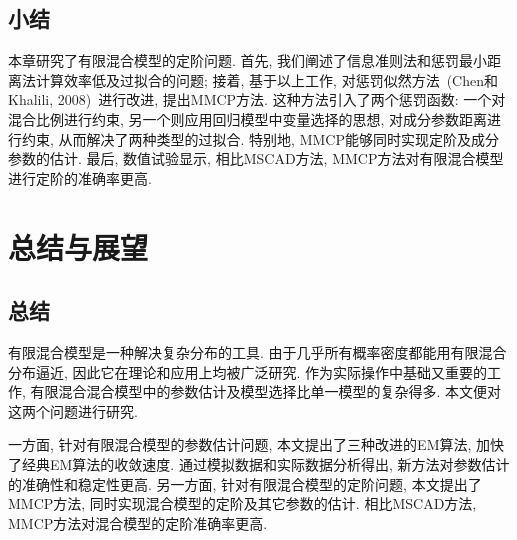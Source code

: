 \documentclass[a4paper,12pt,openany,oneside,utf-8]{ctexbook}
\begin{document}
\section{小结}
本章研究了有限混合模型的定阶问题. 首先, 我们阐述了信息准则法和惩罚最小距离法计算效率低及过拟合的问题; 接着, 基于以上工作, 对惩罚似然方法~(Chen和Khalili, 2008)~进行改进, 提出MMCP方法. 这种方法引入了两个惩罚函数: 一个对混合比例进行约束, 另一个则应用回归模型中变量选择的思想, 对成分参数距离进行约束, 从而解决了两种类型的过拟合. 特别地, MMCP能够同时实现定阶及成分参数的估计. 最后, 数值试验显示, 相比MSCAD方法, MMCP方法对有限混合模型进行定阶的准确率更高.



\chapter[总结与展望]{总结与展望}
\section{总结}
有限混合模型是一种解决复杂分布的工具. 由于几乎所有概率密度都能用有限混合分布逼近, 因此它在理论和应用上均被广泛研究. 作为实际操作中基础又重要的工作, 有限混合混合模型中的参数估计及模型选择比单一模型的复杂得多. 本文便对这两个问题进行研究. 

一方面, 针对有限混合模型的参数估计问题, 本文提出了三种改进的EM算法, 加快了经典EM算法的收敛速度. 通过模拟数据和实际数据分析得出, 新方法对参数估计的准确性和稳定性更高. 另一方面, 针对有限混合模型的定阶问题, 本文提出了MMCP方法, 同时实现混合模型的定阶及其它参数的估计. 相比MSCAD方法, MMCP方法对混合模型的定阶准确率更高.
\end{document}
